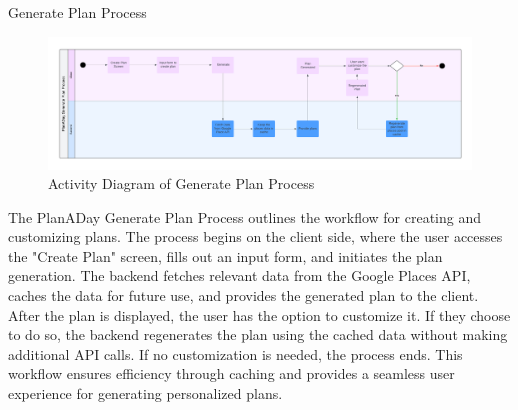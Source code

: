 \newpage
Generate Plan Process
\begin{figure}[!h]
    \centering
    \includegraphics[width=0.5\linewidth]{chapter3/generate-process.png}
    \caption{Activity Diagram of Generate Plan Process}
    \label{fig:Activity Diagram of Generate Plan Process}
\end{figure}
\par
The PlanADay Generate Plan Process outlines the workflow for creating and customizing
plans. The process begins on the client side, where the user accesses the "Create Plan" screen,
fills out an input form, and initiates the plan generation. The backend fetches relevant data from
the Google Places API, caches the data for future use, and provides the generated plan to the
client. After the plan is displayed, the user has the option to customize it. If they choose to do so,
the backend regenerates the plan using the cached data without making additional API calls. If
no customization is needed, the process ends. This workflow ensures efficiency through caching
and provides a seamless user experience for generating personalized plans.

\newpage
